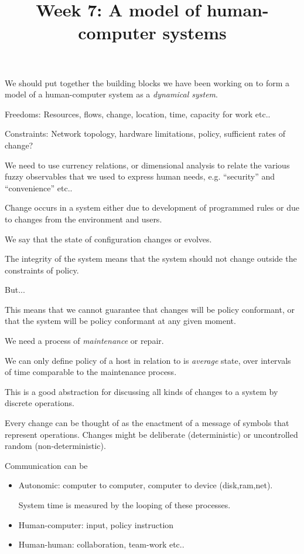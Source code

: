 \documentclass{slides}
\title{Week 7: A model of human-computer systems}
\begin{document}
\maketitle



We should put together the building blocks we have been working on
to form a model of a human-computer system as a {\em dynamical system}.

Freedoms: Resources, flows, change, location, time, capacity for work etc..

Constraints: Network topology, hardware limitations, policy, sufficient rates of change?

We need to use currency relations, or dimensional analysis to relate the
various fuzzy observables that we used to express human needs, e.g. ``security''
and ``convenience'' etc..



Change occurs in a system either due to development of programmed
rules or due to changes from the environment and users.



We say that the state of configuration changes or evolves.

The integrity of the system means that the system should not change
outside the constraints of policy.

But...


This means that we cannot guarantee that changes will be policy
conformant, or that the system will be policy conformant at
any given moment.

We need a process of {\em maintenance} or repair.

We can only define policy of a host in relation to is {\em average}
state, over intervals of time comparable to the maintenance process.


This is a good abstraction for discussing all kinds of changes to a system
by discrete operations.

Every change can be thought of as the enactment of a message of symbols
that represent operations. Changes might be deliberate (deterministic) or
uncontrolled random (non-deterministic).

Communication can be
\begin{itemize}
\item Autonomic: computer to computer, computer to device (disk,ram,net). 

System time is measured by the looping of these processes.

\item Human-computer: input, policy instruction

\item Human-human: collaboration, team-work etc..

\end{itemize}
\end{document}
